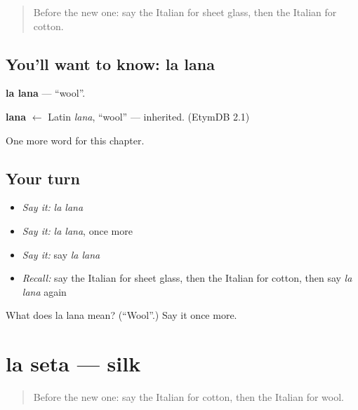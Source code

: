 \label{lesson:IT-C230-lana}



\begin{quote}
Before the new one: say the Italian for sheet glass, then the Italian for cotton.
\end{quote}

\subsection*{You'll want to know: la lana}
\textbf{la lana} — \textquotedblleft{}wool\textquotedblright{}.

\begin{cousinweb}
\textbf{lana} $\leftarrow$ Latin \emph{lana}, \textquotedblleft{}wool\textquotedblright{} — inherited. (EtymDB 2.1)
\end{cousinweb}

\begin{grammarlens}[title={What you've built}]
One more word for this chapter.
\end{grammarlens}

\subsection*{Your turn}
\begin{itemize}
\raggedright
  \item \emph{Say it:} \emph{la lana}
  \item \emph{Say it:} \emph{la lana}, once more
  \item \emph{Say it:} say \emph{la lana}
  \item \emph{Recall:} say the Italian for sheet glass, then the Italian for cotton, then say \emph{la lana} again
\end{itemize}

\begin{tcolorbox}[breakable,colback=teal!4,colframe=teal!35!black,title={Before you move on}]
What does la lana mean? (\textquotedblleft{}Wool\textquotedblright{}.) Say it once more.
\end{tcolorbox}
\section[la seta]{la seta — silk}

\label{lesson:IT-C230-seta}



\begin{quote}
Before the new one: say the Italian for cotton, then the Italian for wool.
\end{quote}

